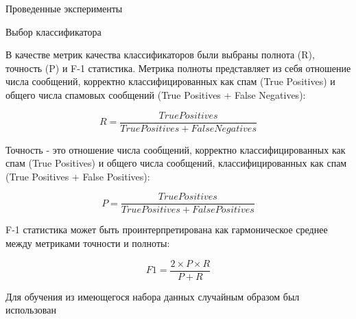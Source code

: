 

\begin{section}{Проведенные эксперименты}

\begin{subsection}{Выбор классификатора}

В качестве метрик качества классификаторов были выбраны полнота (R), точность (P) и F-1 статистика. Метрика полноты представляет из себя отношение числа сообщений, корректно классифицированных как спам (True Positives) и общего числа спамовых сообщений (True Positives + False Negatives):

\begin{equation}
  R = \frac{True Positives}{True Positives + False Negatives}
\end{equation}

Точность - это отношение числа сообщений, корректно классифицированных как спам (True Positives) и общего числа  сообщений, классифицированных как спам (True Positives + False Positives):

\begin{equation}
  P = \frac{True Positives}{True Positives + False Positives}
\end{equation}

F-1 статистика может быть проинтерпретирована как гармоническое среднее между метриками точности и полноты:

\begin{equation}
  F1 = \frac{2 \times P \times R}{P + R}
\end{equation}



Для обучения из имеющегося набора данных случайным образом был использован







\begin{table}[H]
\centering
{}


\end{table}
\end{subsection}
\end{section}
